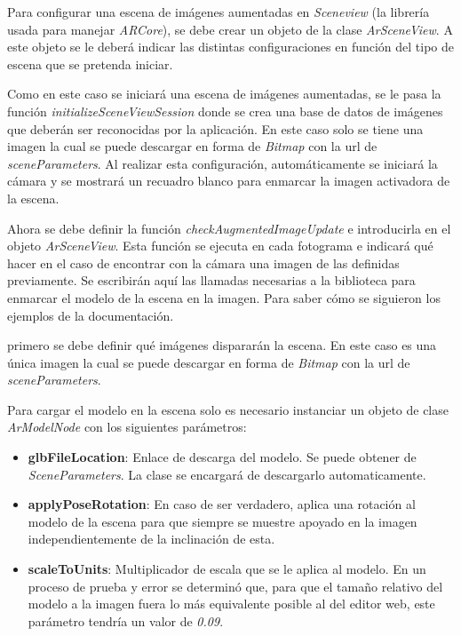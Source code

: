 Para configurar una escena de imágenes aumentadas en \textit{Sceneview} (la librería usada para manejar \textit{ARCore}), se debe crear un objeto de la clase \textit{ArSceneView}. A este objeto se le deberá indicar las distintas configuraciones en función del tipo de escena que se pretenda iniciar.

Como en este caso se iniciará una escena de imágenes aumentadas, se le pasa la función \textit{initializeSceneViewSession} donde se crea una base de datos de imágenes que deberán ser reconocidas por la aplicación. En este caso solo se tiene una imagen la cual se puede descargar en forma de \textit{Bitmap} con la url de \textit{sceneParameters}. Al realizar esta configuración, automáticamente se iniciará la cámara y se mostrará un recuadro blanco para enmarcar la imagen activadora de la escena.

Ahora se debe definir la función \textit{checkAugmentedImageUpdate} e introducirla en el objeto \textit{ArSceneView}. Esta función se ejecuta en cada fotograma e indicará qué hacer en el caso de encontrar con la cámara una imagen de las definidas previamente. Se escribirán aquí las llamadas necesarias a la biblioteca para enmarcar el modelo de la escena en la imagen. Para saber cómo se siguieron los ejemplos de la documentación.

primero se debe definir qué imágenes dispararán la escena. En este caso es una única imagen la cual se puede descargar en forma de \textit{Bitmap} con la url de \textit{sceneParameters}.

Para cargar el modelo en la escena solo es necesario instanciar un objeto de clase \textit{ArModelNode} con los siguientes parámetros:

\begin{itemize}
    \item \textbf{glbFileLocation}: Enlace de descarga del modelo. Se puede obtener de \textit{SceneParameters}. La clase se encargará de descargarlo automaticamente.
    \item \textbf{applyPoseRotation}: En caso de ser verdadero, aplica una rotación al modelo de la escena para que siempre se muestre apoyado en la imagen independientemente de la inclinación de esta.
    \item \textbf{scaleToUnits}: Multiplicador de escala que se le aplica al modelo. En un proceso de prueba y error se determinó que, para que el tamaño relativo del modelo a la imagen fuera lo más equivalente posible al del editor web, este parámetro tendría un valor de \textit{0.09}.
\end{itemize}


